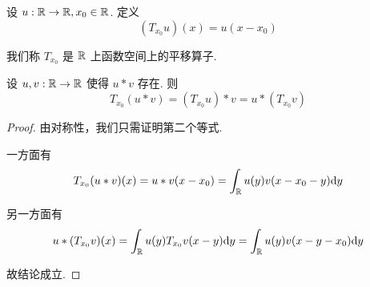 
设 $u:\mathbb{R}\to\mathbb{R},x_0\in\mathbb{R}$. 定义
$$
(T_{x_0}u)(x)=u(x-x_0)
$$

我们称 $T_{x_0}$ 是 $\mathbb{R}$ 上函数空间上的平移算子.

\begin{property}
    设 $u,v:\mathbb{R}\to\mathbb{R}$ 使得 $u*v$ 存在. 则
$$
T_{x_0}(u*v)=(T_{x_0}u)*v=u*(T_{x_0}v)
$$
\end{property}
\begin{proof}
    由对称性，我们只需证明第二个等式.

    一方面有
$$
T_{x_0}(u*v)(x)=u*v(x-x_0)=\int_{\mathbb{R}} u(y)v(x-x_0-y)\mathrm{d} y
$$

    另一方面有
$$
u*(T_{x_0}v)(x)=\int_{\mathbb{R}} u(y)T_{x_0}v(x-y)\mathrm{d} y=\int_{\mathbb{R}} u(y)v(x-y-x_0)\mathrm{d} y
$$

    故结论成立.
\end{proof}